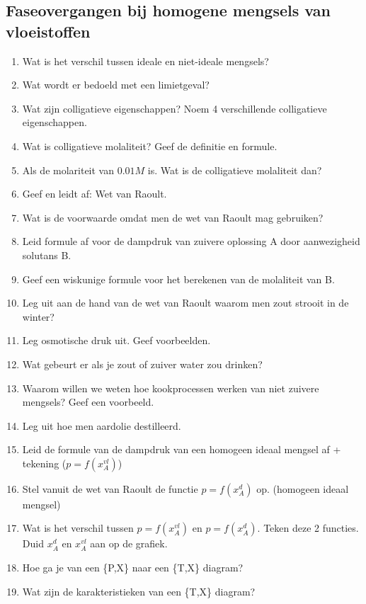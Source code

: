 \documentclass[a4paper,12pt]{article}
\begin{document}
    \subsection{Faseovergangen bij homogene mengsels van vloeistoffen}
    \begin{enumerate}
        \item Wat is het verschil tussen ideale en niet-ideale mengsels?
        \item Wat wordt er bedoeld met een limietgeval?
        \item Wat zijn colligatieve eigenschappen? Noem 4 verschillende colligatieve eigenschappen.
        \item Wat is colligatieve molaliteit? Geef de definitie en formule.
        \item Als de molariteit van  $0.01M$ is. Wat is de colligatieve molaliteit dan?
        \item Geef en leidt af: Wet van Raoult.
        \item Wat is de voorwaarde omdat men de wet van Raoult mag gebruiken?
        \item Leid formule af voor de dampdruk van zuivere oplossing A door aanwezigheid solutans B.
        \item Geef een wiskunige formule voor het berekenen van de molaliteit van B.
        \item Leg uit aan de hand van de wet van Raoult waarom men zout strooit in de winter?
        \item Leg osmotische druk uit. Geef voorbeelden.
        \item Wat gebeurt er als je zout of zuiver water zou drinken?
        \item Waarom willen we weten hoe kookprocessen werken van niet zuivere mengsels? Geef een voorbeeld.
        \item Leg uit hoe men aardolie destilleerd.
        \item Leid de formule van de dampdruk van een homogeen ideaal mengsel af + tekening ($p=f(x^{vl}_A)$)
        \item Stel vanuit de wet van Raoult de functie $ p = f(x_A^d) $ op. (homogeen ideaal mengsel)
        \item Wat is het verschil tussen $p=f(x^{vl}_A)$ en $ p = f(x_A^d) $. Teken deze 2 functies. Duid $x_A^d$ en $x^{vl}_A$ aan op de grafiek.
        \item Hoe ga je van een \{P,X\} naar een \{T,X\} diagram?
        \item Wat zijn de karakteristieken van een \{T,X\} diagram?

\end{enumerate}
\end{document}
